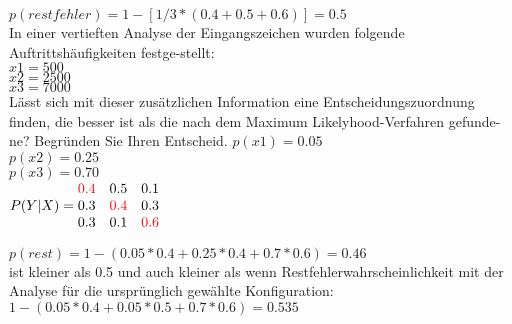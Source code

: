 $p(restfehler) = 1 - [1/3*(0.4+0.5+0.6)] = 0.5$\\

In einer vertieften Analyse der Eingangszeichen wurden folgende Auftrittshäufigkeiten festge-stellt:\\
$x1 = 500$\\
$x2 = 2500$\\
$x3 = 7000$\\

Lässt sich mit dieser zusätzlichen Information eine Entscheidungszuordnung finden, die besser ist als die nach dem Maximum Likelyhood-Verfahren gefunde-ne? Begründen Sie Ihren Entscheid.
$p(x1) = 0.05$\\
$p(x2) = 0.25$\\
$p(x3) = 0.70$\\


$P(Y|X) = \begin{matrix}
    \textcolor{red}{0.4} & 0.5 & 0.1\\
    0.3 & \textcolor{red}{0.4} & 0.3\\
    0.3 & 0.1 & \textcolor{red}{0.6}
\end{matrix}$

$p(rest) = 1-(0.05*0.4 + 0.25*0.4 + 0.7*0.6) = 0.46 $\\

ist kleiner als 0.5 und auch kleiner als wenn Restfehlerwahrscheinlichkeit mit der Analyse für 	die ursprünglich gewählte Konfiguration:\\
$1 - (0.05*0.4 + 0.05*0.5 + 0.7*0.6) = 0.535$
